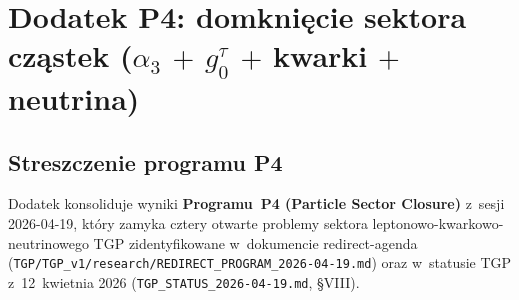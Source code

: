 \providecommand{\Ci}{\operatorname{Ci}}
\providecommand{\Si}{\operatorname{Si}}
\providecommand{\Li}{\operatorname{Li}}
\providecommand{\Cl}{\operatorname{Cl}}

\section*{Dodatek P4: domkni\k{e}cie sektora cz\k{a}stek
($\alpha_3$ $+$ $g_0^\tau$ $+$ kwarki $+$ neutrina)}%
%
\label{app:P4}

\subsection*{Streszczenie programu P4}

Dodatek konsoliduje wyniki \textbf{Programu~P4 (Particle Sector Closure)}
z~sesji 2026-04-19, kt\'ory zamyka cztery otwarte problemy
sektora leptonowo-kwarkowo-neutrinowego TGP zidentyfikowane
w~dokumencie redirect-agenda
(\texttt{TGP/TGP\_v1/research/REDIRECT\_PROGRAM\_2026-04-19.md})
oraz w~statusie TGP z~12~kwietnia 2026
(\texttt{TGP\_STATUS\_2026-04-19.md}, \S VIII).

